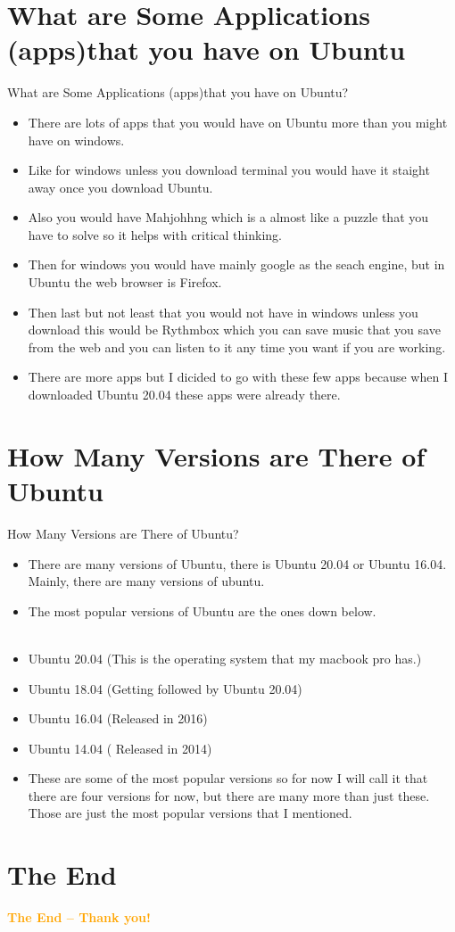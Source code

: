 \documentclass[aspectratio=43]{beamer}
\begin{document}
\section{What are Some Applications (apps)that you have on Ubuntu}
\begin{frame}{What are Some Applications (apps)that you have on Ubuntu?}
\begin{itemize}
\item There are lots of apps that you would have on Ubuntu more than you might have on windows.
\item Like for windows unless you download terminal you would have it staight away once you download Ubuntu.
\item Also you would have Mahjohhng which is a almost like a puzzle that you have to solve so it helps with critical thinking.
\item Then for windows you would have mainly google as the seach engine, but in Ubuntu the web browser is Firefox.
\item Then last but not least that you would not have in windows unless you download this would be Rythmbox which you can save music that you save from the web and you can listen to it any time you want if you are working.
\item There are more apps but I dicided to go with these few apps because when I downloaded Ubuntu 20.04 these apps were already there.
\end{itemize}
\end{frame}

\section{How Many Versions are There of Ubuntu}
\begin{frame}{How Many Versions are There of Ubuntu?}
\begin{itemize}
\item There are many versions of Ubuntu, there is Ubuntu 20.04 or Ubuntu 16.04. Mainly, there are many versions of ubuntu.
\item The most popular versions of Ubuntu are the ones down below.
\\
~\\
\item Ubuntu 20.04 (This is the operating system that my macbook pro has.)
\item Ubuntu 18.04 (Getting followed by Ubuntu 20.04)
\item Ubuntu 16.04 (Released in 2016)
\item Ubuntu 14.04 ( Released in 2014)
\item These are some of the most popular versions so for now I will call it that there are four versions for now, but there are many more than just these. Those are just the most popular versions that I mentioned. 
\end{itemize}
\end{frame}

	
\section{The End}
    \begin{frame}{ }
        \centering
            \Huge\bfseries
        \textcolor{orange}{The End -- Thank you!}
    \end{frame}
\end{document}
